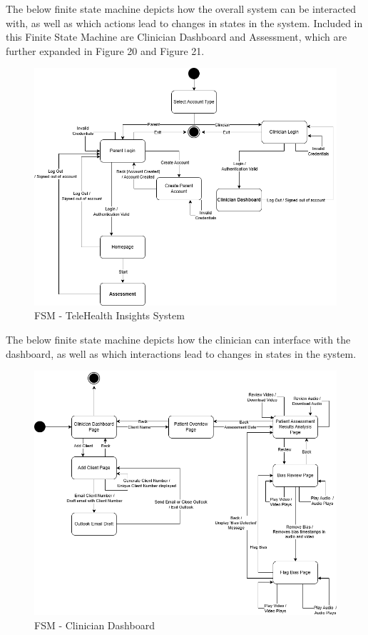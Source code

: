 \documentclass[12pt, titlepage]{article}
\begin{document}
\hspace{1.5em}The below finite state machine depicts how the overall system can be interacted with, as well as which actions lead to changes in states in the system. Included in this Finite State Machine
              are Clinician Dashboard and Assessment, which are further expanded in Figure 20 and Figure 21.
\begin{figure}[H]
  \centering
  \includegraphics[scale=0.6]{images/state_diagram.drawio.png}
  \caption{FSM - TeleHealth Insights System}
\end{figure}

\newpage

\hspace{1.5em}The below finite state machine depicts how the clinician can interface with the dashboard, as well as which interactions lead to changes in states in the system.
\begin{figure}[H]
  \centering
  \includegraphics[scale=0.6]{images/FSM_Clinician_Dashboard.png}
  \caption{FSM - Clinician Dashboard}
\end{figure}
\end{document}
